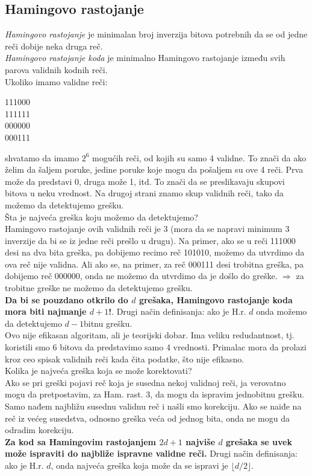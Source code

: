 \documentclass{article} %
\begin{document}
\subsection{Hamingovo rastojanje}
\textit{Hamingovo rastojanje} je minimalan broj inverzija bitova potrebnih da se od jedne reči dobije neka druga reč. \\
\textit{Hamingovo rastojanje koda} je minimalno Hamingovo rastojanje između svih parova validnih kodnih reči.\\
Ukoliko imamo validne reči:
\begin{center}
111000\\
111111\\
000000\\
000111
\end{center}
shvatamo da imamo $ 2^{6} $ mogućih reči, od kojih su samo 4 validne. To znači da ako želim da šaljem poruke, jedine poruke koje mogu da pošaljem su ove 4 reči. Prva može da predstavi 0, druga može 1, itd. To znači da se preslikavaju skupovi bitova u neku vrednost. Na drugoj strani znamo skup validnih reči, tako da možemo da detektujemo grešku. \\

Šta je najveća greška koju možemo da detektujemo?\\
Hamingovo rastojanje ovih validnih reči je 3 (mora da se napravi minimum 3 inverzije da bi se iz jedne reči prešlo u drugu).
Na primer, ako se u reči 111000 desi na dva bita greška, pa dobijemo recimo reč 101010, možemo da utvrdimo da ova reč nije validna. Ali ako se, na primer, za reč 000111 desi trobitna greška, pa dobijemo reč 000000, onda ne možemo da utvrdimo da je došlo do greške. $ \Rightarrow $ za trobitne greške ne možemo da detektujemo grešku.\\
\textbf{Da bi se pouzdano otkrilo do $d$ grešaka, Hamingovo rastojanje koda mora biti najmanje $d+1$!}. Drugi način definisanja: ako je H.r. $d$ onda možemo da detektujemo $d-1$bitnu grešku.\\
Ovo nije efikasan algoritam, ali je teorijski dobar. Ima veliku redudantnost, tj. koristili smo 6 bitova da predstavimo samo 4 vrednosti. Primalac mora da prolazi kroz ceo spisak validnih reči kada čita podatke, što nije efikasno.\\

Kolika je najveća greška koja se može korektovati?\\
Ako se pri greški pojavi reč koja je susedna nekoj validnoj reči, ja verovatno mogu da pretpostavim, za Ham. rast. 3, da mogu da ispravim jednobitnu grešku. Samo nađem najbližu susednu validnu reč i našli smo korekciju. Ako se naiđe na reč iz većeg susedstva, odnosno greška veća od jednog  bita, onda ne mogu da odradim korekciju. \\
\textbf{Za kod sa Hamingovim rastojanjem $2d+1$ najviše $d$ grešaka se uvek može ispraviti do najbliže ispravne validne reči.} Drugi način definisanja: ako je H.r. $d$, onda najveća greška koja može da se ispravi je $\lfloor d/2 \rfloor$.
\end{document}
